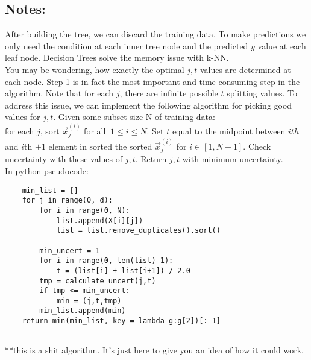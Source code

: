 \documentclass[10pt]{article}
\begin{document}
	
	\subsection*{Notes:}
		After building the tree, we can discard the training data. To make predictions we only need the condition at each 
		inner tree node and the predicted $y$ value at each leaf node. Decision Trees solve the memory issue with k-NN.  \\

		\noindent You may be wondering, how exactly the optimal $j,t$ values are determined at each node. Step 1 is in fact 
		the most important and time consuming step in the algorithm. Note that for each $j$, there are infinite possible 
		$t$ splitting values. To address this issue, we can implement the following algorithm for picking good values for $j, t$.
		Given some subset size N of training data: \\ 
	
		\noindent for each $j$, sort $\vec x_j^{(i)}$  for all  $\ 1 \leq i \leq N$. Set $t$ equal to the midpoint between $ith$ and 
		$i$th $+1$ element in sorted the sorted $\vec x_j^{(i)}$ for $i \in [1,N-1]$. Check uncertainty with these values of $j,t$. 
		Return $j, t$ with minimum uncertainty. \\ 
	
		In python pseudocode:
	
		\begin{lstlisting}
	min_list = []
	for j in range(0, d):
   	    for i in range(0, N):
       		list.append(X[i][j])
    	    list = list.remove_duplicates().sort()
	    
	    min_uncert = 1
  	    for i in range(0, len(list)-1):
	    	t = (list[i] + list[i+1]) / 2.0
		tmp = calculate_uncert(j,t) 
		if tmp <= min_uncert:
		    min = (j,t,tmp)
	    min_list.append(min)
	return min(min_list, key = lambda g:g[2])[:-1]
		
		\end{lstlisting} 
		**this is a shit algorithm. It's just here to give you an idea of how it could work. \\ \\
		
\end{document}
